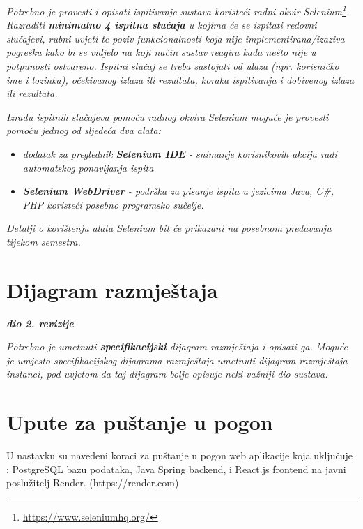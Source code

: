 			 \textit{Potrebno je provesti i opisati ispitivanje sustava koristeći radni okvir Selenium\footnote{\url{https://www.seleniumhq.org/}}. Razraditi \textbf{minimalno 4 ispitna slučaja} u kojima će se ispitati redovni slučajevi, rubni uvjeti te poziv funkcionalnosti koja nije implementirana/izaziva pogrešku kako bi se vidjelo na koji način sustav reagira kada nešto nije u potpunosti ostvareno. Ispitni slučaj se treba sastojati od ulaza (npr. korisničko ime i lozinka), očekivanog izlaza ili rezultata, koraka ispitivanja i dobivenog izlaza ili rezultata.\\ }
			 
			 \textit{Izradu ispitnih slučajeva pomoću radnog okvira Selenium moguće je provesti pomoću jednog od sljedeća dva alata:}
			 \begin{itemize}
			 	\item \textit{dodatak za preglednik \textbf{Selenium IDE} - snimanje korisnikovih akcija radi automatskog ponavljanja ispita	}
			 	\item \textit{\textbf{Selenium WebDriver} - podrška za pisanje ispita u jezicima Java, C\#, PHP koristeći posebno programsko sučelje.}
			 \end{itemize}
		 	\textit{Detalji o korištenju alata Selenium bit će prikazani na posebnom predavanju tijekom semestra.}
			
			\eject 
		
		
		\section{Dijagram razmještaja}
			
			\textbf{\textit{dio 2. revizije}}
			
			 \textit{Potrebno je umetnuti \textbf{specifikacijski} dijagram razmještaja i opisati ga. Moguće je umjesto specifikacijskog dijagrama razmještaja umetnuti dijagram razmještaja instanci, pod uvjetom da taj dijagram bolje opisuje neki važniji dio sustava.}
			
			\eject 
		
		\section{Upute za puštanje u pogon}
		
U nastavku su navedeni koraci za puštanje u pogon web aplikacije koja uključuje
: PostgreSQL bazu podataka, Java Spring backend, i React.js frontend na javni 
poslužitelj Render. (https://render.com)

